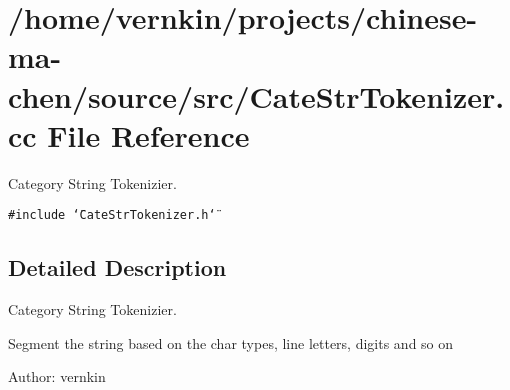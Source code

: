 \section{/home/vernkin/projects/chinese-ma-chen/source/src/CateStrTokenizer.cc File Reference}
\label{CateStrTokenizer_8cc}
Category String Tokenizier.  


{\tt \#include \char`\"{}CateStrTokenizer.h\char`\"{}}\par


\subsection{Detailed Description}
Category String Tokenizier. 

Segment the string based on the char types, line letters, digits and so on

\begin{Desc}
\item[Author:]vernkin \end{Desc}
